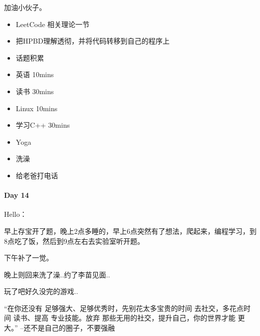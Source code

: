 \documentclass[UTF8,a4paper,8pt]{ctexbook}
\begin{document}
			 加油小伙子。
			 	 \begin{itemize}
			 	 	\item  LeetCode 相关理论一节
			 	 	\item \makebox[0pt][l]{$\square$}\raisebox{.15ex}{\hspace{0.1em}$\checkmark$} 把HPBD理解透彻，并将代码转移到自己的程序上
			 	 	\item \makebox[0pt][l]{$\square$}\raisebox{.15ex}{\hspace{0.1em}$\checkmark$} 话题积累 	
			 	 	\item  英语 10mins 	
			 	 	\item \makebox[0pt][l]{$\square$}\raisebox{.15ex}{\hspace{0.1em}$\checkmark$} 读书 30mins	
			 	 	\item   Linux 10mins	  
			 	 	\item   学习C++ 30mins  
			 	 	\item  \makebox[0pt][l]{$\square$}\raisebox{.15ex}{\hspace{0.1em}$\checkmark$} Yoga
			 	 	\item  \makebox[0pt][l]{$\square$}\raisebox{.15ex}{\hspace{0.1em}$\checkmark$} 洗澡 
			 	 	\item  \makebox[0pt][l]{$\square$}\raisebox{.15ex}{\hspace{0.1em}$\checkmark$} 给老爸打电话
			 	 \end{itemize}
 	 \paragraph{Day 14      \quad     }
			 	 Hello：
			 	 
			 	 早上存宝开了题，晚上2点多睡的，早上6点突然有了想法，爬起来，编程学习，到8点吃了饭，然后到9点左右去实验室听开题。
			 	 
			 	 下午补了一觉。
			 	 
			 	 晚上则回来洗了澡..约了李苗见面..
			 	 
			 	 玩了吧好久没完的游戏..
			 	 
			 	 “在你还没有 足够强大、足够优秀时，先别花太多宝贵的时间 去社交，多花点时间 读书、提高 专业技能。放弃 那些无用的社交，提升自己，你的世界才能 更大。” --还不是自己的圈子，不要强融~
			 	 			 	 
\end{document}
